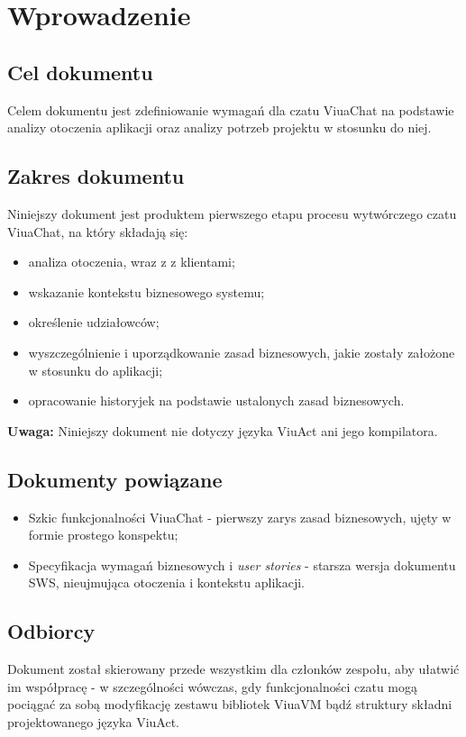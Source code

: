 \section{Wprowadzenie}

\subsection{Cel dokumentu}
Celem dokumentu jest zdefiniowanie wymagań dla czatu ViuaChat na podstawie analizy otoczenia aplikacji oraz analizy potrzeb projektu w stosunku do niej.

\subsection{Zakres dokumentu}
Niniejszy dokument jest produktem pierwszego etapu procesu wytwórczego czatu ViuaChat, na który składają się:
\begin{itemize}
    \item analiza otoczenia, wraz z z klientami;
    \item wskazanie kontekstu biznesowego systemu;
    \item określenie udziałowców;
	\item wyszczególnienie i uporządkowanie zasad biznesowych, jakie zostały założone w stosunku do aplikacji;
	\item opracowanie historyjek na podstawie ustalonych zasad biznesowych.
\end{itemize}

\textbf{Uwaga:} Niniejszy dokument nie dotyczy języka ViuAct ani jego kompilatora.

\subsection{Dokumenty powiązane}
\begin{itemize}
	\item Szkic funkcjonalności ViuaChat - pierwszy zarys zasad biznesowych, ujęty w formie prostego konspektu;
	\item Specyfikacja wymagań biznesowych i \textit{user stories} - starsza wersja dokumentu SWS, nieujmująca otoczenia i kontekstu aplikacji.
\end{itemize}

\subsection{Odbiorcy}
Dokument został skierowany przede wszystkim dla członków zespołu, aby ułatwić im współpracę - w szczególności wówczas, gdy funkcjonalności czatu mogą pociągać za sobą modyfikację zestawu bibliotek ViuaVM bądź struktury składni projektowanego języka ViuAct.

